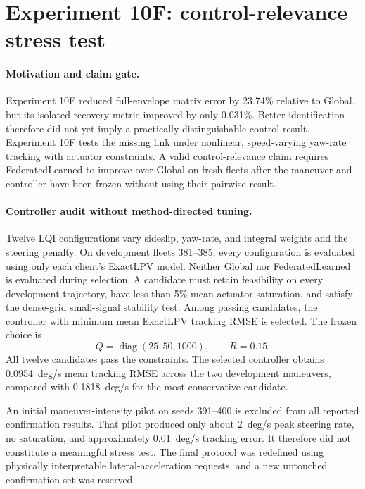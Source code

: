 \section{Experiment 10F: control-relevance stress test}
\label{sec:experiment10f}

\paragraph{Motivation and claim gate.}
Experiment 10E reduced full-envelope matrix error by 23.74\% relative to
Global, but its isolated recovery metric improved by only 0.031\%. Better
identification therefore did not yet imply a practically distinguishable
control result. Experiment 10F tests the missing link under nonlinear,
speed-varying yaw-rate tracking with actuator constraints. A valid
control-relevance claim requires FederatedLearned to improve over Global on
fresh fleets after the maneuver and controller have been frozen without using
their pairwise result.

\paragraph{Controller audit without method-directed tuning.}
Twelve LQI configurations vary sideslip, yaw-rate, and integral weights and the
steering penalty. On development fleets 381--385, every configuration is
evaluated using only each client's ExactLPV model. Neither Global nor
FederatedLearned is evaluated during selection. A candidate must retain
feasibility on every development trajectory, have less than 5\% mean actuator
saturation, and satisfy the dense-grid small-signal stability test. Among
passing candidates, the controller with minimum mean ExactLPV tracking RMSE is
selected. The frozen choice is
\begin{equation}
 Q=\operatorname{diag}(25,50,1000),\qquad R=0.15.
\end{equation}
All twelve candidates pass the constraints. The selected controller obtains
0.0954~deg/s mean tracking RMSE across the two development maneuvers, compared
with 0.1818~deg/s for the most conservative candidate.

An initial maneuver-intensity pilot on seeds 391--400 is excluded from all
reported confirmation results. That pilot produced only about 2~deg/s peak
steering rate, no saturation, and approximately 0.01~deg/s tracking error. It
therefore did not constitute a meaningful stress test. The final protocol was
redefined using physically interpretable lateral-acceleration requests, and a
new untouched confirmation set was reserved.

